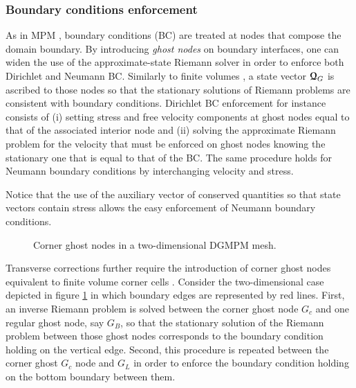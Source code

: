 \subsubsection*{Boundary conditions enforcement}
As in MPM \cite{Love,BC_MPM}, boundary conditions (BC) are treated at nodes that compose the domain boundary.
By introducing \textit{ghost nodes} on boundary interfaces, one can widen the use of the approximate-state Riemann solver in order to enforce both Dirichlet and Neumann BC.
Similarly to finite volumes \cite{Leveque}, a state vector ${\boldsymbol{\mathcal{Q}}}_G$ is ascribed to those nodes so that the stationary solutions of Riemann problems are consistent with boundary conditions.
Dirichlet BC enforcement for instance consists of (i) setting stress and free velocity components at ghost nodes equal to that of the associated interior node and (ii) solving the approximate Riemann problem for the velocity that must be enforced on ghost nodes knowing the stationary one that is equal to that of the BC.
The same procedure holds for Neumann boundary conditions by interchanging velocity and stress.

Notice that the use of the auxiliary vector of conserved quantities so that state vectors contain stress %
allows the easy enforcement of Neumann boundary conditions. %
\begin{figure}[ht]
  \centering
  
  \caption{Corner ghost nodes in a two-dimensional DGMPM mesh.}
  \label{fig:corner_ghost}
\end{figure}
Transverse corrections further require the introduction of corner ghost nodes equivalent to finite volume corner cells \cite{Leveque}.
Consider the two-dimensional case depicted in figure \ref{fig:corner_ghost} in which boundary edges are represented by red lines.
First, an inverse Riemann problem is solved between the corner ghost node $G_c$ and one regular ghost node, say $G_B$, so that the stationary solution of the Riemann problem between those ghost nodes corresponds to the boundary condition holding on the vertical edge.
Second, this procedure is repeated between the corner ghost $G_c$ node and $G_L$ in order to enforce the boundary condition holding on the bottom boundary between them.

